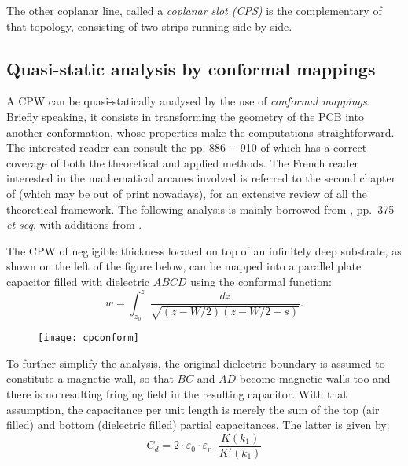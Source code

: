 The other coplanar line, called a \emph{coplanar slot (CPS)} is the
complementary of that topology, consisting of two strips running side
by side.

\subsection{Quasi-static analysis by conformal mappings}

A CPW can be quasi-statically analysed by the use of
\emph{conformal mappings}.  Briefly speaking, it consists in
transforming the geometry of the PCB into another conformation, whose
properties make the computations straightforward.  The interested
reader can consult the pp. 886~-~910 of \cite{Collin} which has a
correct coverage of both the theoretical and applied methods.  The
French reader interested in the mathematical arcanes involved is
referred to the second chapter of \cite{Mir} (which may be out of
print nowadays), for an extensive review of all the theoretical
framework.  The following analysis is mainly borrowed from
\cite{Gupta1}, pp.~375 \emph{et seq}. with additions from
\cite{Collin}.

\addvspace{12pt}

The CPW of negligible thickness located on top of an infinitely deep
substrate, as shown on the left of the figure below, can be mapped
into a parallel plate capacitor filled with dielectric $ABCD$ using
the conformal function:
\begin{equation}
w = \int_{z_0}^{z}\dfrac{dz}{\sqrt{(z-W/2)(z-W/2-s)}}.
\end{equation}

\begin{figure}[ht]
\begin{center}
\texttt{[image: cpconform]}
\end{center}
\label{fig:CoplanarConformal}
\end{figure}
\FloatBarrier

To further simplify the analysis, the original dielectric boundary is
assumed to constitute a magnetic wall, so that $BC$ and $AD$ become
magnetic walls too and there is no resulting fringing field in the
resulting capacitor.  With that assumption, the capacitance per unit
length is merely the sum of the top (air filled) and bottom
(dielectric filled) partial capacitances.  The latter is given by:
\begin{equation}
C_d = 2\cdot \varepsilon_0\cdot \varepsilon_r\cdot \dfrac{K(k_1)}{K'(k_1)}
\end{equation}

